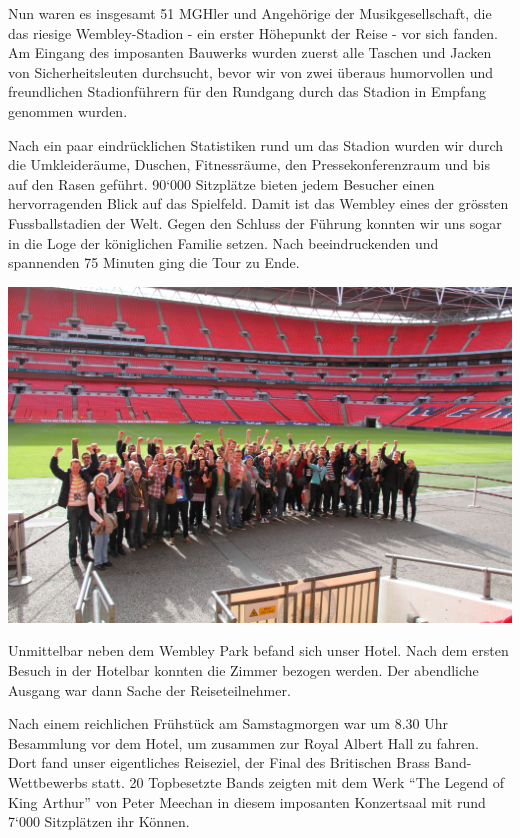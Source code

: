 \begin{history}
    Nun waren es insgesamt 51 MGHler und Angehörige der Musikgesellschaft, die
    das riesige Wembley-Stadion - ein erster Höhepunkt der Reise - vor sich
    fanden. Am Eingang des imposanten Bauwerks wurden zuerst alle Taschen und
    Jacken von Sicherheitsleuten durchsucht, bevor wir von zwei überaus
    humorvollen und freundlichen Stadionführern für den Rundgang durch das
    Stadion in Empfang genommen wurden.

    Nach ein paar eindrücklichen Statistiken rund um das Stadion wurden wir
    durch die Umkleideräume, Duschen, Fitnessräume, den Pressekonferenzraum und
    bis auf den Rasen geführt. 90`000 Sitzplätze bieten jedem Besucher einen
    hervorragenden Blick auf das Spielfeld. Damit ist das Wembley eines der
    grössten Fussballstadien der Welt. Gegen den Schluss der Führung konnten wir
    uns sogar in die Loge der königlichen Familie setzen. Nach beeindruckenden
    und spannenden 75 Minuten ging die Tour zu Ende.

    \begin{MulticolFigure}
        \centering
        \includegraphics[width=0.93\linewidth]{./chap/2001-2024/2014/Wembley-Gruppe.jpg}
    \end{MulticolFigure}

    Unmittelbar neben dem Wembley Park befand sich unser Hotel. Nach dem ersten
    Besuch in der Hotelbar konnten die Zimmer bezogen werden. Der abendliche
    Ausgang war dann Sache der Reiseteilnehmer.

    Nach einem reichlichen Frühstück am Samstagmorgen war um 8.30 Uhr Besammlung
    vor dem Hotel, um zusammen zur Royal Albert Hall zu fahren. Dort fand unser
    eigentliches Reiseziel, der Final des Britischen Brass Band-Wettbewerbs
    statt. 20 Topbesetzte Bands zeigten mit dem Werk \enquote{The Legend of King
        Arthur} von Peter Meechan in diesem imposanten Konzertsaal mit rund 7‘000
    Sitzplätzen ihr Können.


\end{history}
